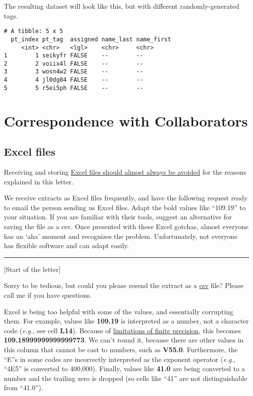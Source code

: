 \documentclass[
]{book}
\begin{document}
The resulting dataset will look like this, but with different randomly-generated tags.

\begin{verbatim}
# A tibble: 5 x 5
  pt_index pt_tag  assigned name_last name_first
     <int> <chr>   <lgl>    <chr>     <chr>
1        1 seikyfr FALSE    --        --
2        2 voiix4l FALSE    --        --
3        3 wosn4w2 FALSE    --        --
4        4 jl0dg84 FALSE    --        --
5        5 r5ei5ph FALSE    --        --
\end{verbatim}

\hypertarget{snippets-correspondence}{%
\section{Correspondence with Collaborators}\label{snippets-correspondence}}

\hypertarget{snippets-correspondence-excel}{%
\subsection{Excel files}\label{snippets-correspondence-excel}}

Receiving and storing \protect\hyperlink{data-containers-avoid}{Excel files should almost always be avoided} for the reasons explained in this letter.

We receive extracts as Excel files frequently, and have the following request ready to email the person sending us Excel files. Adapt the bold values like ``109.19'' to your situation. If you are familiar with their tools, suggest an alternative for saving the file as a csv. Once presented with these Excel gotchas, almost everyone has an `aha' moment and recognizes the problem. Unfortunately, not everyone has flexible software and can adapt easily.

\begin{center}\rule{0.5\linewidth}{0.5pt}\end{center}

{[}Start of the letter{]}

Sorry to be tedious, but could you please resend the extract as a \href{https://en.wikipedia.org/wiki/Comma-separated_values}{csv} file? Please call me if you have questions.

Excel is being too helpful with some of the values, and essentially corrupting them. For example, values like \textbf{109.19} is interpreted as a number, not a character code (\emph{e.g.}, see cell \textbf{L14}). Because of \href{https://docs.oracle.com/cd/E19957-01/806-3568/ncg_goldberg.html}{limitations of finite precision}, this becomes \textbf{109.18999999999999773}. We can't round it, because there are other values in this column that cannot be cast to numbers, such as \textbf{V55.0}. Furthermore, the ``E''s in some codes are incorrectly interpreted as the exponent operator (\emph{e.g.}, ``4E5'' is converted to 400,000). Finally, values like \textbf{41.0} are being converted to a number and the trailing zero is dropped (so cells like ``41'' are not distinguishable from ``41.0'').
\end{document}
